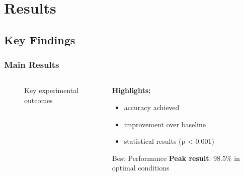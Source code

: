 \section{Results}

\subsection{Key Findings}
\begin{frame}
    \frametitle{Main Results}
    \begin{columns}
        \begin{column}{0.6\textwidth}
            \begin{figure}
                \centering
                \caption{Key experimental outcomes}
            \end{figure}
        \end{column}
        \begin{column}{0.4\textwidth}
            \textbf{Highlights:}
            \begin{itemize}
                \item {} accuracy achieved
                \item {} improvement over baseline
                \item {} statistical results (p < 0.001)
            \end{itemize}
            
            \vspace{1em}
            \begin{exampleblock}{Best Performance}
                \textbf{Peak result}: 98.5\% in optimal conditions
            \end{exampleblock}
        \end{column}
    \end{columns}
\end{frame}

